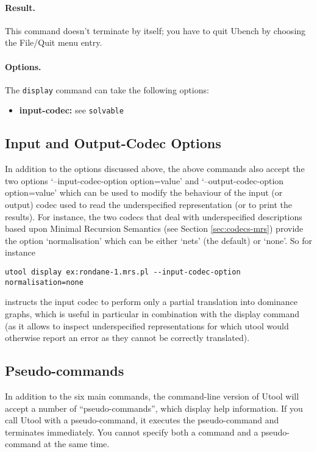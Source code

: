 \paragraph{Result.} This command doesn't terminate by itself; you have
to quit Ubench by choosing the File/Quit menu entry.

\paragraph{Options.} The \verb?display? command can take the following
options:

\begin{itemize}
\item \textbf{input-codec:} see \verb?solvable? 
\end{itemize}


\subsection{Input and Output-Codec Options}

In addition to the options discussed above, the above commands also accept the
two options `--input-codec-option option=value' and `--output-codec-option
option=value' which can be used to modify the behaviour of the input (or output)
codec used to read the underspecified representation (or to print the results).
For instance, the two codecs that deal with underspecified descriptions based
upon Minimal Recursion Semantics (see Section \ref{sec:codecs-mrs}) provide the
option `normalisation' which can be either `nets' (the default) or `none'. So
for instance

\begin{verbatim}
utool display ex:rondane-1.mrs.pl --input-codec-option normalisation=none
\end{verbatim}

instructs the input codec to perform only a partial translation into dominance graphs, which is useful in particular in combination with the display command (as it allows to inspect underspecified representations for which utool would otherwise report an error as they cannot be correctly translated).


\subsection{Pseudo-commands}

In addition to the six main commands, the command-line version of
Utool will accept a number of ``pseudo-commands'', which display help
information. If you call Utool with a pseudo-command, it executes the
pseudo-command and terminates immediately. You cannot specify both a
command and a pseudo-command at the same time.

